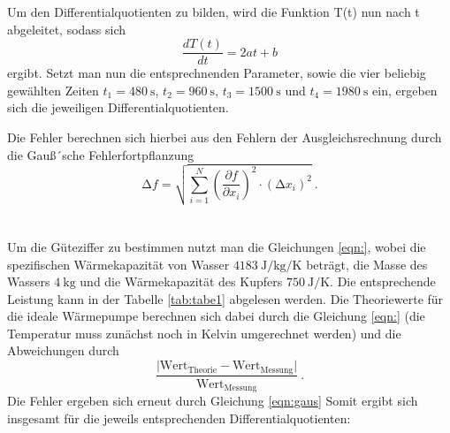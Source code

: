 Um den Differentialquotienten zu bilden, wird die Funktion T(t) nun nach t abgeleitet, sodass
sich
\begin{equation}
  \frac{d T(t)}{d t} = 2at +b
\end{equation}
ergibt.
Setzt man nun die entsprechnenden Parameter, sowie die vier beliebig gewählten Zeiten
$t_1 = \SI{480}{\second}$, $t_2 = \SI{960}{\second}$, $t_3 = \SI{1500}{\second}$
und $t_4 = \SI{1980}{\second}$ ein, ergeben sich die jeweiligen Differentialquotienten.

Die Fehler berechnen sich hierbei aus den Fehlern der Ausgleichsrechnung durch die Gauß´sche
Fehlerfortpflanzung
\begin{equation}
  \increment f = \sqrt{ \sum_{i=1}^N \left( \frac{\partial f}{\partial x_i}\right)^2
  \cdot (\increment x_i)^2  } \: .
  \label{eqn:gaus}
\end{equation}
\\
\\
\noindent Um die Güteziffer zu bestimmen nutzt man die Gleichungen \ref{eqn:},
wobei die spezifischen Wärmekapazität von Wasser $\SI{4183}{\joule\per\kilo\gram\per\kelvin}$ \cite{chemie}
beträgt, die Masse des Wassers $\SI{4}{\kilo\gram}$ und die Wärmekapazität des Kupfers
$\SI{750}{\joule\per\kelvin}$. Die entsprechende Leistung kann in der Tabelle \ref{tab:tabe1}
abgelesen werden. Die Theoriewerte für die ideale Wärmepumpe berechnen sich dabei durch die Gleichung
\ref{eqn:} (die Temperatur muss zunächst noch in Kelvin umgerechnet werden) und die Abweichungen durch
\begin{equation*}
  \frac{\lvert \text{Wert}_{\text{Theorie}}-\text{Wert}_{\text{Messung}}\rvert}{\text{Wert}_{\text{Messung}}} \: .
\end{equation*}
Die Fehler ergeben sich erneut durch Gleichung \ref{eqn:gaus}
Somit ergibt sich insgesamt für die jeweils entsprechenden Differentialquotienten:


